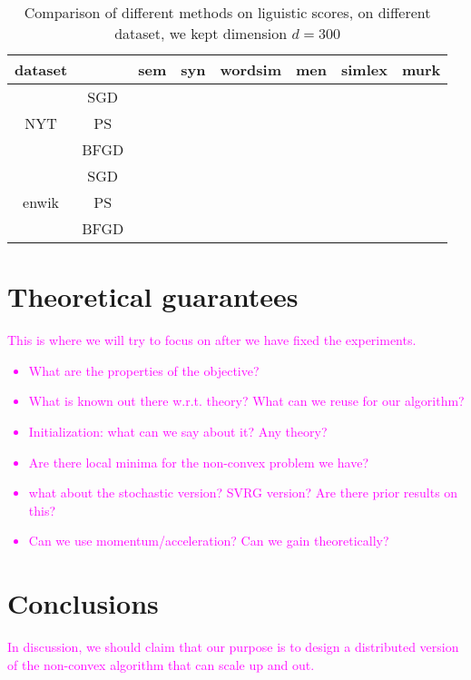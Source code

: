 \documentclass[letterpaper]{article} %
\begin{document}
\begin{table}[]
\begin{tabular}{|c|c|c|c|c|c|c|c|}
\hline
   dataset  &      & sem & syn & wordsim & men & simlex & murk \\ \hline

\multirow{3}{*}{NYT} & SGD   &     &     &         &     &        &      \\ \cline{2-8} 
					 & PS   &     &     &         &     &        &      \\ \cline{2-8} 
                     & BFGD &     &     &         &     &        &      \\ \hline
\multirow{3}{*}{enwik} & SGD   &     &     &         &     &        &      \\ \cline{2-8} 
					 & PS   &     &     &         &     &        &      \\ \cline{2-8} 
                     & BFGD &     &     &         &     &        &      \\ \hline
\end{tabular}
\caption{Comparison of different methods on liguistic scores, on different dataset, we kept dimension $d=300$}
\end{table}
\section{Theoretical guarantees}
\textcolor{magenta}{This is where we will try to focus on after we have fixed the experiments. 
\begin{itemize}
\item What are the properties of the objective?
\item What is known out there w.r.t. theory? What can we reuse for our algorithm?
\item Initialization: what can we say about it? Any theory?
\item Are there local minima for the non-convex problem we have?
\item what about the stochastic version? SVRG version? Are there prior results on this?
\item Can we use momentum/acceleration? Can we gain theoretically?
\end{itemize}}

\section{Conclusions}
\textcolor{magenta}{In discussion, we should claim that our purpose is to design a distributed version of the non-convex algorithm that can scale up and out.}



\end{document}
